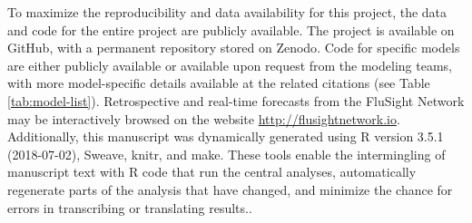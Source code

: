 \documentclass{article}\usepackage[]{graphicx}\usepackage[]{color}
\begin{document}
To maximize the reproducibility and data availability for this project, the data and code for the entire project are publicly available.
The project is available on GitHub\cite{fsngithub2018}, with a permanent repository stored on Zenodo\cite{fsnzenodo2018}.
Code for specific models are either publicly available or available upon request from the modeling teams, with more model-specific details available at the related citations (see Table \ref{tab:model-list}).
Retrospective and real-time forecasts from the FluSight Network may be interactively browsed on the website \url{http://flusightnetwork.io}.
Additionally, this manuscript was dynamically generated using R version 3.5.1 (2018-07-02), Sweave, knitr, and make.
These tools enable the intermingling of manuscript text with R code that run the central analyses, automatically regenerate parts of the analysis that have changed, and minimize the chance for errors in transcribing or translating results.\cite{Xie2015,RCore2017}.




\end{document}
